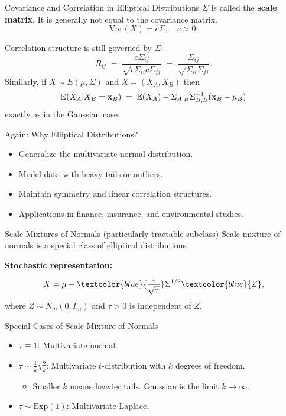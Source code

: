 \documentclass[11pt,handout,aspectratio=169]{beamer}
\begin{document}
\begin{frame}{Covariance and Correlation in Elliptical Distributions}
$\Sigma$ is called the \textbf{scale matrix}. It is generally not equal to the covariance matrix.
\medskip
      \begin{equation*}
        \mathrm{Var}(X) = c \Sigma, \quad c > 0.
      \end{equation*}

Correlation structure is still governed by $\Sigma$:
$$
R_{ij}\;=\;\frac{c\Sigma_{ij}}{\sqrt{c\Sigma_{ii}c\Sigma_{jj}}}\;=\;\frac{\Sigma_{ij}}{\sqrt{\Sigma_{ii}\Sigma_{jj}}}.
$$
Similarly, if $X\sim E(\mu,\Sigma)$ and $X=(X_A,X_B)$ then 
$$
\mathbb E(X_A|X_B=\mathbf{x}_B)\;=\;\mathbb E(X_A)-\Sigma_{A,B}\Sigma_{B,B}^{-1}(\mathbf{x}_B-\mu_B)
$$
exactly as in the Gaussian case.
\end{frame}


\begin{frame}{Again: Why Elliptical Distributions?}
    \begin{itemize}
        \item Generalize the multivariate normal distribution.\\[5mm]
        \item Model data with heavy tails or outliers.\\[5mm]
        \item Maintain symmetry and linear correlation structures.\\[5mm]
        \item Applications in finance, insurance, and environmental studies.
    \end{itemize}
\end{frame}

\begin{frame}{Scale Mixtures of Normals (particularly tractable subclass)}
Scale mixture of normals is a special class of elliptical distributions. 
\bigskip

  \textbf{Stochastic representation:}
  \begin{equation*}
    X = \mu + \textcolor{blue}{\frac{1}{\sqrt{\tau}}} \Sigma^{1/2} \textcolor{blue}{Z},
  \end{equation*}
  where $Z \sim N_m(0, I_m)$ and $\tau > 0$ is independent of $Z$.
  \vspace{0.5cm}
  \begin{block}{Special Cases of Scale Mixture of Normals}
  	  \begin{itemize}
    \item $\tau \equiv 1$: Multivariate normal.
    \item $\tau \sim \frac{1}{k} \chi^2_k$: Multivariate $t$-distribution with $k$ degrees of freedom.
    \begin{itemize}
    \item Smaller $k$ means heavier tails. Gaussian is the limit $k\to \infty$.
    \end{itemize}
    \item $\tau \sim \text{Exp}(1)$: Multivariate Laplace.
  \end{itemize}
    \end{block}
\end{frame}
\end{document}
